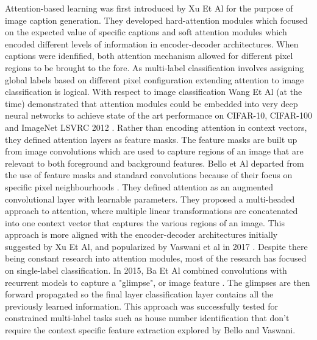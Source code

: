 \documentclass[8pt]{article}
\begin{document}
Attention-based learning was first introduced by Xu Et Al for the purpose of image caption generation\cite{xu2016show}. They developed hard-attention modules which focused on the expected value of specific captions and soft attention modules which encoded different levels of information in encoder-decoder architectures. When captions were idenfified, both attention mechanism allowed for different pixel regions to be brought to the fore. As multi-label classification involves assigning global labels based on different pixel configuration extending attention to image classification is logical.
\newline
\newline
With respect to image classification Wang Et Al (at the time) demonstrated that attention modules could be embedded into very deep neural networks to achieve state of the art performance on CIFAR-10, CIFAR-100 and ImageNet LSVRC 2012 \cite{wang2017residual}. Rather than encoding attention in context vectors, they defined attention layers as feature masks. The feature masks are built up from image convolutions which are used to capture regions of an image that are relevant to both foreground and background features.
\newline
\newline
Bello et Al departed from the use of feature masks and standard convolutions because of their focus on specific pixel neighbourhoods \cite{bello2020attention}. They defined attention as an augmented convolutional layer with learnable parameters. They proposed a multi-headed approach to attention, where multiple linear transformations are concatenated into one context vector that captures the various regions of an image. This approach is more aligned with the encoder-decoder architectures initially suggested by Xu Et Al, and popularized by Vaswani et al in 2017 \cite{vaswani2017attention}.
\newline
\newline
Despite there being constant research into attention modules, most of the research has focused on single-label classification. In 2015, Ba Et Al combined convolutions with recurrent models to capture a "glimpse", or image feature \cite{ba2015multiple}. The glimpses are then forward propagated so the final layer classification layer contains all the previously learned information. This approach was successfully tested for constrained multi-label tasks such as house number identification that don't require the context specific feature extraction explored by Bello and Vaswani.
\newline
\end{document}
